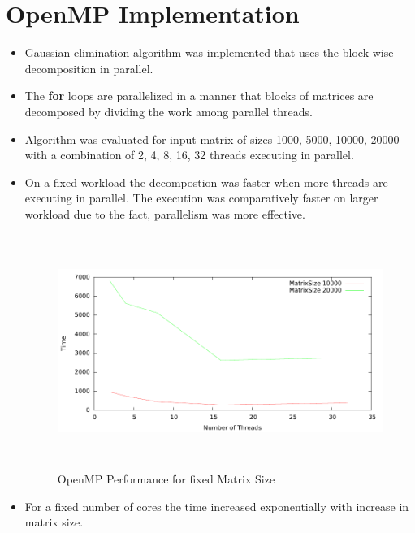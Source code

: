 \documentclass{article}
\begin{document}
\section{OpenMP Implementation}
\begin{itemize}
\item Gaussian elimination algorithm was implemented that uses the block wise decomposition in parallel.
\item The \textbf{for} loops are parallelized in a manner that blocks of matrices are decomposed by dividing the work among parallel threads.
\item Algorithm was evaluated for input matrix of sizes 1000, 5000, 10000, 20000 with a combination of 2, 4, 8, 16, 32 threads executing in parallel.
\item On a fixed workload the decompostion was faster when more threads are executing in parallel. The execution was comparatively faster on larger workload due to the fact, parallelism was more effective.

\begin{figure}[H]
\begin{center}
\includegraphics[height=3in,width=5in]{Graphs/omp_core_time.pdf}
\caption{OpenMP Performance for fixed Matrix Size}
\end{center}
\end{figure}

\item For a fixed number of cores the time increased exponentially with increase in matrix size.


\end{itemize}
\end{document}
